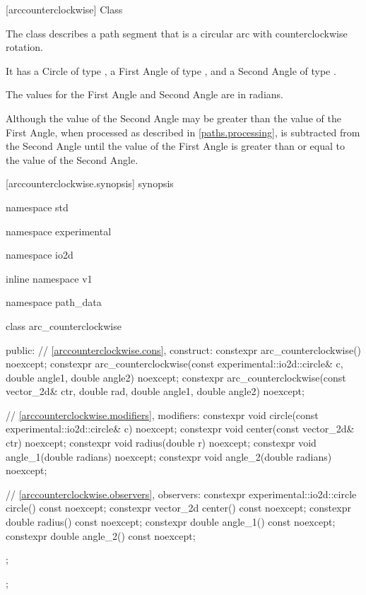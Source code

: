  [arccounterclockwise] {Class }

\pnum
{}
The class  describes a path segment that is a circular arc with counterclockwise rotation.

\pnum
It has a Circle of type , a First Angle of type , and a Second Angle of type .

\pnum
The values for the First Angle and Second Angle are in radians.

\pnum
\begin{note}
Although the value of the Second Angle may be greater than the value of the First Angle, when processed as described in \ref{paths.processing},  is subtracted from the Second Angle until the value of the First Angle is greater than or equal to the value of the Second Angle.
\end{note}

 [arccounterclockwise.synopsis] { synopsis}

\begin{codeblock}
namespace std { namespace experimental { namespace io2d { inline namespace v1 {
  namespace path_data {
    class arc_counterclockwise {
    public:
      // \ref{arccounterclockwise.cons}, construct:
      constexpr arc_counterclockwise() noexcept;
      constexpr arc_counterclockwise(const experimental::io2d::circle& c,
        double angle1, double angle2) noexcept;
      constexpr arc_counterclockwise(const vector_2d& ctr, double rad,
        double angle1, double angle2) noexcept;

      // \ref{arccounterclockwise.modifiers}, modifiers:
      constexpr void circle(const experimental::io2d::circle& c) noexcept;
      constexpr void center(const vector_2d& ctr) noexcept;
      constexpr void radius(double r) noexcept;
      constexpr void angle_1(double radians) noexcept;
      constexpr void angle_2(double radians) noexcept;

      // \ref{arccounterclockwise.observers}, observers:
      constexpr experimental::io2d::circle circle() const noexcept;
      constexpr vector_2d center() const noexcept;
      constexpr double radius() const noexcept;
      constexpr double angle_1() const noexcept;
      constexpr double angle_2() const noexcept;
    };
  };
} } } }
\end{codeblock}

